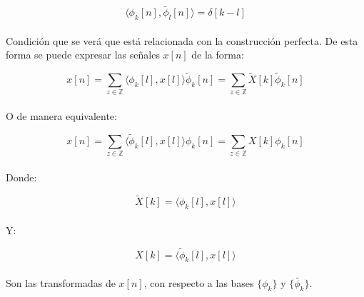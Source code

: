 \begin{equation}
	\langle \phi_k[n] , \tilde{\phi_l}[n] \rangle = \delta[k - l]
\end{equation}

\paragraph{}
Condición que se verá que está relacionada con la construcción perfecta. De esta forma se puede expresar las señales $x[n]$ de la forma:

\begin{equation}
	x[n] = \sum_{z \in \mathbb{Z}} \langle \phi_k[l] , x[l] \rangle \tilde{\phi}_{k}[n] = \sum_{z \in \mathbb{Z}} \tilde{X}[k] \tilde{\phi}_{k}[n]
\end{equation}

\paragraph{}
O de manera equivalente:

\begin{equation}
	x[n] = \sum_{z \in \mathbb{Z}} \langle \tilde{\phi}_k[l] , x[l] \rangle \phi_{k}[n] = \sum_{z \in \mathbb{Z}} X[k] \phi_{k}[n]
\end{equation}

\paragraph{}
Donde:

\begin{equation}
	\tilde{X}[k] = \langle \phi_k[l] , x[l] \rangle
\end{equation}

\paragraph{}
Y:

\begin{equation}
	X[k] = \langle \tilde{\phi}_k[l] , x[l] \rangle
\end{equation}

\paragraph{}
Son las transformadas de $x[n]$, con respecto a las bases $\{ \phi_{k} \}$ y $\{ \tilde{\phi_{k}} \}$.
